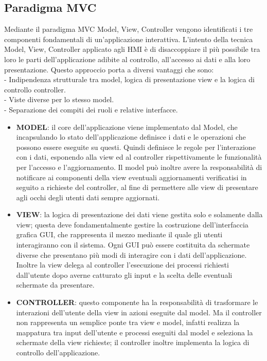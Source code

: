 \documentclass[12pt, a4paper, oneside]{book}
\begin{document}
\subsection{Paradigma MVC}
Mediante il paradigma MVC Model, View, Controller vengono identificati i tre componenti fondamentali di un'applicazione interattiva. L'intento della tecnica Model, View, Controller applicato agli HMI è di disaccoppiare il più possibile tra loro le parti dell'applicazione adibite al controllo, all'accesso ai dati e alla loro presentazione. Questo approccio porta a diversi vantaggi che sono:
\\- Indipendenza strutturale tra model, logica di presentazione view e la logica di controllo controller.
\\- Viste diverse per lo stesso model.
\\- Separazione dei compiti dei ruoli e relative interfacce.
\begin{itemize}
	\item \textbf{MODEL}: il core dell'applicazione viene implementato dal Model, che incapsulando lo stato dell'applicazione definisce i dati e le operazioni che possono essere eseguite su questi. Quindi definisce le regole per l'interazione con i dati, esponendo alla view ed al controller rispettivamente le funzionalità per l'accesso e l'aggiornamento. Il model può inoltre avere la responsabilità di notificare ai componenti della view eventuali aggiornamenti verificatisi in seguito a richieste del controller, al fine di permettere alle view di presentare agli occhi degli utenti dati sempre aggiornati.
	\item \textbf{VIEW}: la logica di presentazione dei dati viene gestita solo e solamente dalla view; questa deve fondamentalmente gestire la costruzione dell'interfaccia grafica GUI, che rappresenta il mezzo mediante il quale gli utenti interagiranno con il sistema. Ogni GUI può essere costituita da schermate diverse che presentano più modi di interagire con i dati dell'applicazione. Inoltre la view delega al controller l'esecuzione dei processi richiesti dall'utente dopo averne catturato gli input e la scelta delle eventuali schermate da presentare. 
	\item \textbf{CONTROLLER}: questo componente ha la responsabilità di trasformare le interazioni dell'utente della view in azioni eseguite dal model. Ma il controller non rappresenta un semplice ponte tra view e model, infatti realizza la mappatura tra input dell'utente e processi eseguiti dal model e seleziona la schermate della view richieste; il controller inoltre implementa la logica di controllo dell'applicazione.
\end{itemize} 
\end{document}
